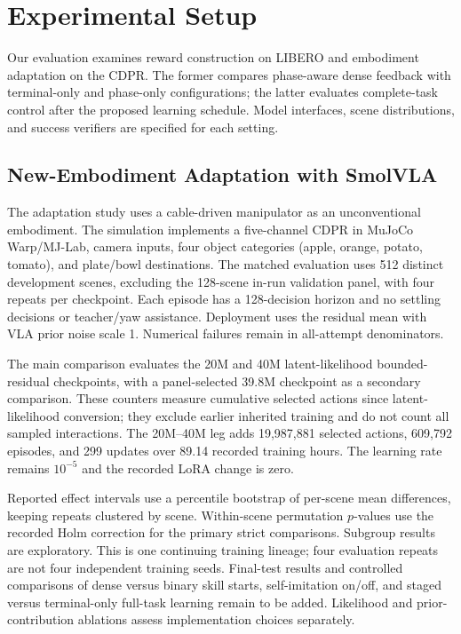 \section{Experimental Setup}\label{sec:setup}
Our evaluation examines reward construction on LIBERO and embodiment adaptation on the CDPR. The former compares phase-aware dense feedback with terminal-only and phase-only configurations; the latter evaluates complete-task control after the proposed learning schedule. Model interfaces, scene distributions, and success verifiers are specified for each setting.

\subsection{New-Embodiment Adaptation with SmolVLA}
The adaptation study uses a cable-driven manipulator as an unconventional embodiment. The simulation implements a five-channel CDPR in MuJoCo Warp/MJ-Lab, camera inputs, four object categories (apple, orange, potato, tomato), and plate/bowl destinations. The matched evaluation uses 512 distinct development scenes, excluding the 128-scene in-run validation panel, with four repeats per checkpoint. Each episode has a 128-decision horizon and no settling decisions or teacher/yaw assistance. Deployment uses the residual mean with VLA prior noise scale 1. Numerical failures remain in all-attempt denominators. 

The main comparison evaluates the 20M and 40M latent-likelihood bounded-residual checkpoints, with a panel-selected 39.8M checkpoint as a secondary comparison. These counters measure cumulative selected actions since latent-likelihood conversion; they exclude earlier inherited training and do not count all sampled interactions. The 20M--40M leg adds 19,987,881 selected actions, 609,792 episodes, and 299 updates over 89.14 recorded training hours. The learning rate remains $10^{-5}$ and the recorded LoRA change is zero.

Reported effect intervals use a percentile bootstrap of per-scene mean differences, keeping repeats clustered by scene. Within-scene permutation $p$-values use the recorded Holm correction for the primary strict comparisons. Subgroup results are exploratory. This is one continuing training lineage; four evaluation repeats are not four independent training seeds. Final-test results and controlled comparisons of dense versus binary skill starts, self-imitation on/off, and staged versus terminal-only full-task learning remain to be added. Likelihood and prior-contribution ablations assess implementation choices separately.


